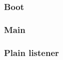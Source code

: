 %
%				
%					
%					
%					
%					
%					
%					
			
			\subsubsection{Boot}
			
			\subsubsection{Main}
			
			\subsubsection{Plain listener}
	
